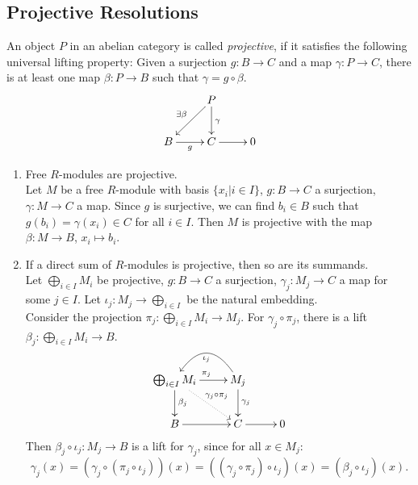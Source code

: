 \subsection{Projective Resolutions}

\begin{definition}
	An object $P$ in an abelian category is called \textit{projective}, if it satisfies the following universal lifting property:
	Given a surjection $g:B\rightarrow C$ and a map $\gamma:P\rightarrow C$, there is at least one map $\beta: P\rightarrow B$ such that $\gamma=g\circ\beta$.
	\[
		\xymatrix{
			&P \ar[ld]_{\exists\beta} \ar[d]^\gamma \\
			B \ar[r]_g &C \ar[r] &0
		}
	\]
\end{definition}

\begin{remark}
	\begin{enumerate}[label=(\roman*)]
		\item Free $R$-modules are projective. \\
		Let $M$ be a free $R$-module with basis $\{x_i\vert i\in I\}$, $g:B\rightarrow C$ a surjection, $\gamma:M\rightarrow C$ a map.
		Since $g$ is surjective, we can find $b_i\in B$ such that $g(b_i)=\gamma(x_i)\in C$ for all $i \in I$.
		Then $M$ is projective with the map $\beta:M\rightarrow B$, $x_i\mapsto b_i$.
		
		\item If a direct sum of $R$-modules is projective, then so are its summands.\\
		Let $\bigoplus_{i\in I}M_i$ be projective, $g:B\rightarrow C$ a surjection, $\gamma_j:M_j \rightarrow C$ a map for some $j\in I$.
		Let $\iota_j:M_j\rightarrow \bigoplus_{i\in I}$ be the natural embedding. \\
		Consider the projection $\pi_j:\bigoplus_{i\in I}M_i\rightarrow M_j$. For $\gamma_j\circ\pi_j$, there is a lift $\beta_j:\bigoplus_{i\in I}M_i\rightarrow B$.
		\[
			\xymatrix{
				\bigoplus_{i\in I}M_i \ar[r]^{\pi_j} \ar[d]^{\beta_j} \ar@{.>}[rd]^{\gamma_j\circ\pi_j} &M_j \ar[d]^{\gamma_j} \ar@/_2pc/[l]^{\iota_j} \\
				B \ar[r] &C \ar[r] &0
			}
		\]
		Then $\beta_j\circ\iota_j: M_j\rightarrow B$ is a lift for $\gamma_j$, since for all $x \in M_j$:
		$$\gamma_j(x) = (\gamma_j \circ (\pi_j \circ \iota_j))(x) = ((\gamma_j \circ \pi_j) \circ \iota_j)(x) = (\beta_j \circ \iota_j)(x).$$
	\end{enumerate}
\end{remark}


